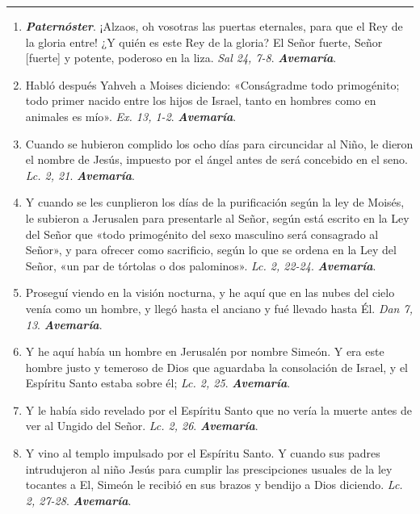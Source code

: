 \documentclass[11pt,a4paper]{book}
\begin{document}
    \rule{\textwidth}{0.5pt}

    \begin{enumerate}
        \item \textbf{\emph{Paternóster}}. ¡Alzaos, oh vosotras las puertas eternales, para que el Rey de la gloria entre!
            ¿Y quién es este Rey de la gloria? El Señor fuerte, Señor [fuerte] y potente, poderoso en la liza. \emph{Sal 24, 7-8}. \textbf{\emph{Avemaría}}.

        \item Habló después Yahveh a Moises diciendo: «Conságradme todo primogénito; todo primer nacido entre los hijos de Israel, tanto en hombres como en animales es mío». 
            \emph{Ex. 13, 1-2}. \textbf{\emph{Avemaría}}.

        \item Cuando se hubieron complido los ocho días para circuncidar al Niño, le dieron el nombre de Jesús, impuesto por el ángel antes de será concebido en el seno. 
            \emph{Lc. 2, 21}. \textbf{\emph{Avemaría}}.

        \item Y cuando se les cunplieron los días de la purificación según la ley de Moisés, le subieron a Jerusalen para presentarle al Señor, 
            según está escrito en la Ley del Señor que «todo primogénito del sexo masculino será consagrado al Señor», 
            y para ofrecer como sacrificio, según lo que se ordena en la Ley del Señor, «un par de tórtolas o dos palominos». \emph{Lc. 2, 22-24}. \textbf{\emph{Avemaría}}.

        \item Proseguí viendo en la visión nocturna, y he aquí que en las nubes del cielo venía como un hombre, y llegó hasta el anciano y fué llevado hasta Él. 
            \emph{Dan 7, 13}. \textbf{\emph{Avemaría}}.

        \item Y he aquí había un hombre en Jerusalén por nombre Simeón. Y era este hombre justo y temeroso de Dios que aguardaba la consolación de Israel, 
            y el Espíritu Santo estaba sobre él; \emph{Lc. 2, 25}. \textbf{\emph{Avemaría}}.

        \item Y le había sido revelado por el Espíritu Santo que no vería la muerte antes de ver al Ungido del Señor. \emph{Lc. 2, 26}. \textbf{\emph{Avemaría}}.

        \item Y vino al templo impulsado por el Espíritu Santo. Y cuando sus padres intrudujeron al niño Jesús para cumplir 
            las prescipciones usuales de la ley tocantes a El, Simeón le recibió en sus brazos y bendijo a Dios diciendo. \emph{Lc. 2, 27-28}. \textbf{\emph{Avemaría}}.


\end{enumerate}
\end{document}
